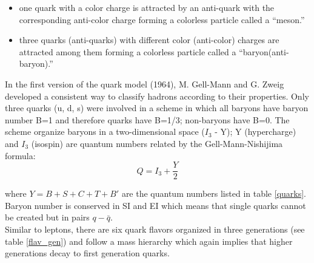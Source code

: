 \begin{itemize}
\item one quark with a color charge is attracted by an anti-quark with the corresponding anti-color charge forming a colorless particle called a ``meson.''
\item three quarks (anti-quarks) with different color (anti-color) charges are attracted among them forming a colorless particle called a ``baryon(anti-baryon).''          
\end{itemize}

\noindent In the first version of the quark model (1964), M. Gell-Mann\cite{gellman} and G. Zweig\cite{zweig,zweig2} developed a consistent way to classify hadrons according to their properties. Only three quarks (u, d, s) were involved in a scheme in which all baryons have baryon number B=1 and therefore quarks have B=1/3; non-baryons have B=0. The scheme organize baryons in a two-dimensional space ($I_3$ - Y); Y (hypercharge) and $I_3$ (isospin) are quantum numbers related by the Gell-Mann-Nishijima formula\cite{gell_ni,gell_ni2}:
\begin{equation}
Q=I_3 + \frac{Y}{2}
\label{gmn}
\end{equation}

\noindent where $Y=B+S+C+T+B'$ are the quantum numbers listed in table \ref{quarks}. Baryon number is conserved in SI and EI which means that single quarks cannot be created but in pairs $q-\bar{q}$.\\

\noindent Similar to leptons, there are six quark flavors organized in three generations (see table \ref{flav_gen}) and follow a mass hierarchy which again implies that higher generations decay to first generation quarks.

